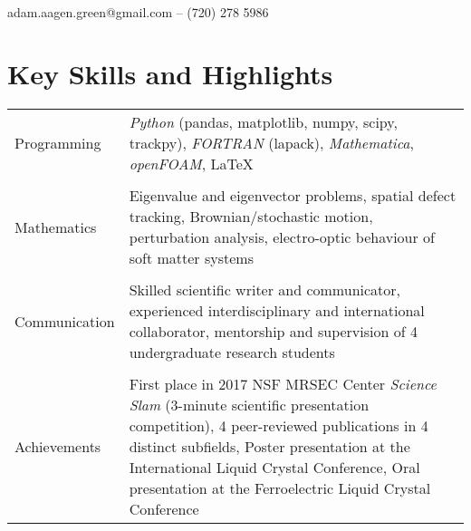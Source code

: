 \documentclass[11.5pt, a4paper]{article}
\begin{document}
 
\hspace*{-\parindent}
\begin{minipage}{0.75\textwidth}
    \begin{flushleft}
        \\
        adam.aagen.green@gmail.com -- (720) 278 5986\\
    \end{flushleft}
\end{minipage}

                                  

\section*{Key Skills and Highlights}          
\vspace{-.1in}
\noindent \begin{tabular}{@{}l p{}}\\
        Programming& \textit{Python} (pandas, matplotlib, numpy,
        scipy, trackpy), \textit{FORTRAN} (lapack), \textit{Mathematica},
    \textit{openFOAM}, \LaTeX \\ \\
            Mathematics & Eigenvalue and eigenvector problems, spatial defect
            tracking, Brownian/stochastic motion, perturbation
            analysis, electro-optic behaviour of soft matter systems\\\\
            Communication & Skilled scientific writer and communicator, experienced
    interdisciplinary and international collaborator, mentorship and supervision
    of 4 undergraduate research students\\\\
            Achievements & First place in 2017 NSF MRSEC Center \textit{Science Slam}
    (3-minute scientific presentation competition), 4 peer-reviewed publications
    in 4 distinct subfields, Poster presentation at the International Liquid Crystal
    Conference, Oral presentation at the Ferroelectric Liquid Crystal Conference
\end{tabular}
\end{document}
